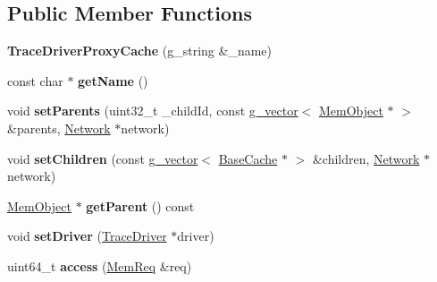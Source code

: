\subsection*{Public Member Functions}
\begin{DoxyCompactItemize}
\item 
\hypertarget{classTraceDriverProxyCache_ad5ca59ffb64ba31ac887b8661866187c}{{\bfseries Trace\-Driver\-Proxy\-Cache} (g\-\_\-string \&\-\_\-name)}\label{classTraceDriverProxyCache_ad5ca59ffb64ba31ac887b8661866187c}

\item 
\hypertarget{classTraceDriverProxyCache_aa0f558fb9b39b117f6eb3d66c1998625}{const char $\ast$ {\bfseries get\-Name} ()}\label{classTraceDriverProxyCache_aa0f558fb9b39b117f6eb3d66c1998625}

\item 
\hypertarget{classTraceDriverProxyCache_a0259f6810fd340ea625bd89036cce845}{void {\bfseries set\-Parents} (uint32\-\_\-t \-\_\-child\-Id, const \hyperlink{classg__vector}{g\-\_\-vector}$<$ \hyperlink{classMemObject}{Mem\-Object} $\ast$ $>$ \&parents, \hyperlink{classNetwork}{Network} $\ast$network)}\label{classTraceDriverProxyCache_a0259f6810fd340ea625bd89036cce845}

\item 
\hypertarget{classTraceDriverProxyCache_a18eaadba894624e11bbd25412a2a4f43}{void {\bfseries set\-Children} (const \hyperlink{classg__vector}{g\-\_\-vector}$<$ \hyperlink{classBaseCache}{Base\-Cache} $\ast$ $>$ \&children, \hyperlink{classNetwork}{Network} $\ast$network)}\label{classTraceDriverProxyCache_a18eaadba894624e11bbd25412a2a4f43}

\item 
\hypertarget{classTraceDriverProxyCache_a7056ebc7197051c1283417e830cd36b4}{\hyperlink{classMemObject}{Mem\-Object} $\ast$ {\bfseries get\-Parent} () const }\label{classTraceDriverProxyCache_a7056ebc7197051c1283417e830cd36b4}

\item 
\hypertarget{classTraceDriverProxyCache_a1cbce92d89270aac1d26efafaac8b0f5}{void {\bfseries set\-Driver} (\hyperlink{classTraceDriver}{Trace\-Driver} $\ast$driver)}\label{classTraceDriverProxyCache_a1cbce92d89270aac1d26efafaac8b0f5}

\item 
\hypertarget{classTraceDriverProxyCache_af33428c4393b91b0c043440da629934a}{uint64\-\_\-t {\bfseries access} (\hyperlink{structMemReq}{Mem\-Req} \&req)}\label{classTraceDriverProxyCache_af33428c4393b91b0c043440da629934a}


\end{DoxyCompactItemize}
